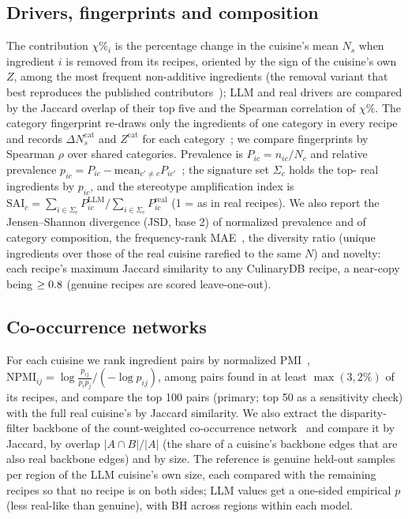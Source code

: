 \documentclass[conference]{IEEEtran}
\newcommand{\Ns}{N_s}
\begin{document}
\subsection{Drivers, fingerprints and composition}
The contribution $\chi\%_i$ is the percentage change in the cuisine's mean $\Ns$ when ingredient $i$ is removed from its recipes, oriented by the sign of the cuisine's own $Z$, among the \NChiTopK{} most frequent non-additive ingredients (the removal variant that best reproduces the published contributors~\cite{singh2018}); LLM and real drivers are compared by the Jaccard overlap of their top five and the Spearman correlation of $\chi\%$. The category fingerprint re-draws only the ingredients of one category in every recipe and records $\Delta N_s^{\mathrm{cat}}$ and $Z^{\mathrm{cat}}$ for each category~\cite{jain2015}; we compare fingerprints by Spearman $\rho$ over shared categories. Prevalence is $P_{ic}=n_{ic}/N_c$ and relative prevalence $p_{ic}=P_{ic}-\mathrm{mean}_{c'\neq c}P_{ic'}$~\cite{jain2018}; the signature set $\Sigma_c$ holds the top-\NSignatureK{} real ingredients by $p_{ic}$, and the stereotype amplification index is $\mathrm{SAI}_c=\sum_{i\in\Sigma_c}P^{\mathrm{LLM}}_{ic}/\sum_{i\in\Sigma_c}P^{\mathrm{real}}_{ic}$ (1 = as in real recipes). We also report the Jensen--Shannon divergence (JSD, base 2) of normalized prevalence and of category composition, the frequency-rank MAE~\cite{tuwani2019}, the diversity ratio (unique ingredients over those of the real cuisine rarefied to the same $N$) and novelty: each recipe's maximum Jaccard similarity to any CulinaryDB recipe, a near-copy being $\geq0.8$ (genuine recipes are scored leave-one-out).

\subsection{Co-occurrence networks}
For each cuisine we rank ingredient pairs by normalized PMI~\cite{bouma2009}, $\mathrm{NPMI}_{ij}=\log\frac{p_{ij}}{p_ip_j}\big/(-\log p_{ij})$, among pairs found in at least $\max(3, 2\%)$ of its recipes, and compare the top 100 pairs (primary; top 50 as a sensitivity check) with the full real cuisine's by Jaccard similarity. We also extract the disparity-filter backbone of the count-weighted co-occurrence network~\cite{serrano2009} and compare it by Jaccard, by overlap $|A\cap B|/|A|$ (the share of a cuisine's backbone edges that are also real backbone edges) and by size. The reference is \NNetDraws{} genuine held-out samples per region of the LLM cuisine's own size, each compared with the remaining recipes so that no recipe is on both sides; LLM values get a one-sided empirical $p$ (less real-like than genuine), with BH across regions within each model.
\end{document}
